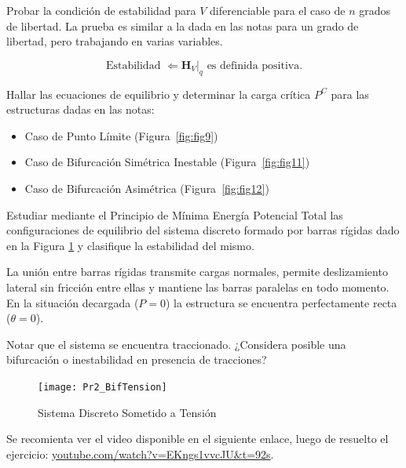 
\bigskip
\begin{exercise}
	
	Probar la condición de estabilidad para $V$ diferenciable para el caso de $n$ grados de libertad. La prueba es similar a la dada en las notas para un grado de libertad, pero trabajando en varias variables.
	
	$$\text{Estabilidad } \Leftarrow \left. \textbf{H}_V  \right|_{\hat{q}} \text{ es definida positiva.}$$
	
\end{exercise}


\bigskip
\begin{exercise}
	
	Hallar las ecuaciones de equilibrio y determinar la carga crítica $P^C$ para las estructuras dadas en las notas:
	\begin{itemize}
		\item Caso de Punto Límite (Figura~\ref{fig:fig9})
		
		
		\item Caso de Bifurcación Simétrica Inestable (Figura~\ref{fig:fig11})
		\item Caso de Bifurcación Asimétrica (Figura~\ref{fig:fig12})
	\end{itemize}
\end{exercise}


\bigskip
\begin{exercise}
	
	Estudiar mediante el Principio de Mínima Energía Potencial Total las configuraciones de equilibrio del sistema discreto formado por barras rígidas dado en la Figura \ref{fig:Ej3a} y clasifique la estabilidad del mismo.
	
	La unión entre barras rígidas transmite cargas normales, permite deslizamiento lateral sin fricción entre ellas y mantiene las barras paralelas en todo momento.
	En la situación decargada ($P=0$) la estructura se encuentra perfectamente recta ($\theta=0$).
	
	Notar que el sistema se encuentra traccionado. ¿Considera posible una bifurcación o inestabilidad en presencia de tracciones?
	
	\begin{figure}[h!]
		\centering
		\texttt{[image: Pr2\_BifTension]}
		\caption{Sistema Discreto Sometido a Tensión}
		\label{fig:Ej3a}
	\end{figure}
	
	Se recomienta ver el video disponible en el siguiente enlace, luego de resuelto el ejercicio:  \href{https://www.youtube.com/watch?v=EKngs1vvcJU\&t=92s}{youtube.com/watch?v=EKngs1vvcJU\&t=92s}.
	
\end{exercise}

